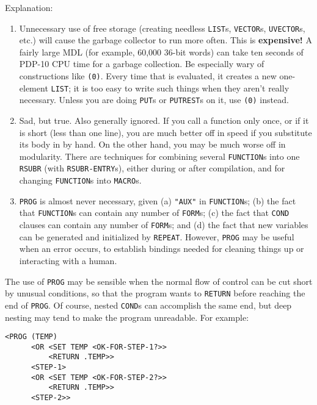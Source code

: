 \documentclass[a4paper]{scrbook}
\providecommand{\tightlist}{%
  \setlength{\itemsep}{0pt}\setlength{\parskip}{0pt}}
\begin{document}
Explanation:

\begin{enumerate}
\def\labelenumi{\arabic{enumi}.}
\tightlist
\item
  Unnecessary use of free storage (creating needless \texttt{LIST}s,
  \texttt{VECTOR}s, \texttt{UVECTOR}s, etc.) will cause the garbage
  collector to run more often. This is \textbf{expensive!} A fairly large MDL (for example, 60,000 36-bit words) can take
  ten seconds of PDP-10 CPU time for a garbage collection. Be especially wary of constructions like \texttt{(0)}. Every
  time that is evaluated, it creates a new one-element \texttt{LIST}; it is too easy to write such things when they aren't
  really necessary. Unless you are doing \texttt{PUT}s or \texttt{PUTREST}s on it, use \texttt{\textquotesingle{}(0)}
  instead.
\item
  Sad, but true. Also generally ignored. If you call a function only once, or if it is short (less than one line), you are
  much better off in speed if you substitute its body in by hand. On the other hand, you may be much worse off in
  modularity. There are techniques for combining several \texttt{FUNCTION}s into one \texttt{RSUBR} (with
  \texttt{RSUBR-ENTRY}s), either during or after compilation, and for changing \texttt{FUNCTION}s into \texttt{MACRO}s.
\item
  \texttt{PROG} is almost never necessary, given (a) \texttt{"AUX"} in \texttt{FUNCTION}s; (b) the fact that
  \texttt{FUNCTION}s can contain any number of \texttt{FORM}s; (c) the fact that \texttt{COND} clauses can contain any
  number of \texttt{FORM}s; and (d) the fact that new variables can be generated and initialized by \texttt{REPEAT}.
  However, \texttt{PROG} may be useful when an error occurs, to establish bindings needed for cleaning things up or
  interacting with a human.
\end{enumerate}

The use of \texttt{PROG} may be sensible when the normal flow of control can be cut short by unusual conditions, so that
the program wants to \texttt{RETURN} before reaching the end of \texttt{PROG}. Of course, nested \texttt{COND}s can
accomplish the same end, but deep nesting may tend to make the program unreadable. For example:

\begin{verbatim}
<PROG (TEMP)
      <OR <SET TEMP <OK-FOR-STEP-1?>>
          <RETURN .TEMP>>
      <STEP-1>
      <OR <SET TEMP <OK-FOR-STEP-2?>>
          <RETURN .TEMP>>
      <STEP-2>>
\end{verbatim}
\end{document}
